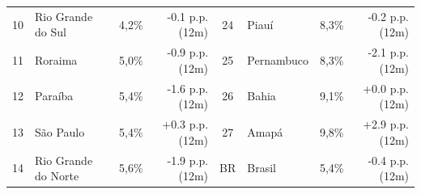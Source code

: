 \documentclass[10pt,a4paper]{article}
\begin{document}
\begin{minipage}{\linewidth}
{{\begin{tabular}{clrrclrr}
\rowcolor{corfundo} 10\textordmasculine{} & Rio Grande do Sul & 4,2\% & -0.1 p.p. (12m) & 24\textordmasculine{} & Piauí & 8,3\% & -0.2 p.p. (12m) \\
11\textordmasculine{} & Roraima & 5,0\% & -0.9 p.p. (12m) & 25\textordmasculine{} & Pernambuco & 8,3\% & -2.1 p.p. (12m) \\
\rowcolor{corfundo} 12\textordmasculine{} & Paraíba & 5,4\% & -1.6 p.p. (12m) & 26\textordmasculine{} & Bahia & 9,1\% & +0.0 p.p. (12m) \\
13\textordmasculine{} & São Paulo & 5,4\% & +0.3 p.p. (12m) & 27\textordmasculine{} & Amapá & 9,8\% & +2.9 p.p. (12m) \\
\rowcolor{corfundo} 14\textordmasculine{} & Rio Grande do Norte & 5,6\% & -1.9 p.p. (12m) & BR & Brasil & 5,4\% & -0.4 p.p. (12m) \\
\bottomrule
\end{tabular}%
}%
}
  \par{}
\end{minipage}
\par\vspace{0.08cm}
\end{document}
